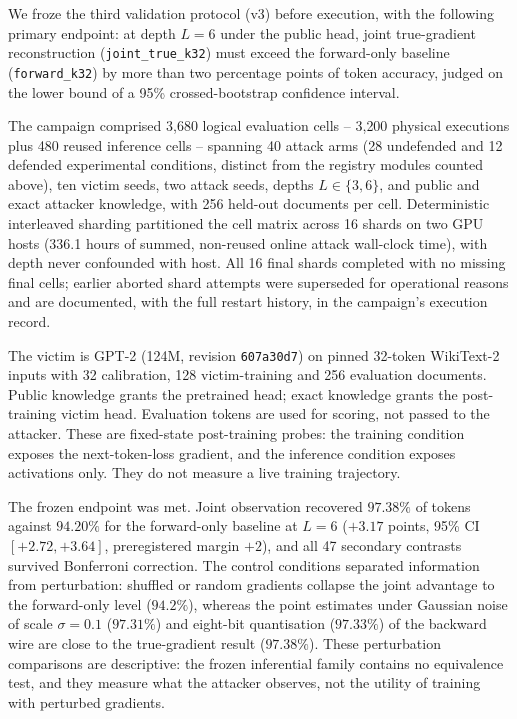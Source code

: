 \documentclass[11pt]{article}
\begin{document}
We froze the third validation protocol (v3) before execution, with the following primary endpoint: at depth $L{=}6$ under the public head, joint true-gradient reconstruction (\texttt{joint\_true\_k32}) must exceed the forward-only baseline (\texttt{forward\_k32}) by more than two percentage points of token accuracy, judged on the lower bound of a 95\% crossed-bootstrap confidence interval.

The campaign comprised 3{,}680 logical evaluation cells -- 3{,}200 physical executions plus 480 reused inference cells -- spanning 40 attack arms (28 undefended and 12 defended experimental conditions, distinct from the registry modules counted above), ten victim seeds, two attack seeds, depths $L \in \{3, 6\}$, and public and exact attacker knowledge, with 256 held-out documents per cell. Deterministic interleaved sharding partitioned the cell matrix across 16 shards on two GPU hosts (336.1 hours of summed, non-reused online attack wall-clock time), with depth never confounded with host. All 16 final shards completed with no missing final cells; earlier aborted shard attempts were superseded for operational reasons and are documented, with the full restart history, in the campaign's execution record.

The victim is GPT-2 (124M, revision \texttt{607a30d7}) on pinned 32-token WikiText-2 inputs with 32 calibration, 128 victim-training and 256 evaluation documents. Public knowledge grants the pretrained head; exact knowledge grants the post-training victim head. Evaluation tokens are used for scoring, not passed to the attacker. These are fixed-state post-training probes: the training condition exposes the next-token-loss gradient, and the inference condition exposes activations only. They do not measure a live training trajectory.

The frozen endpoint was met. Joint observation recovered $97.38\%$ of tokens against $94.20\%$ for the forward-only baseline at $L{=}6$ ($+3.17$ points, 95\% CI $[+2.72, +3.64]$, preregistered margin $+2$), and all 47 secondary contrasts survived Bonferroni correction. The control conditions separated information from perturbation: shuffled or random gradients collapse the joint advantage to the forward-only level ($94.2\%$), whereas the point estimates under Gaussian noise of scale $\sigma{=}0.1$ ($97.31\%$) and eight-bit quantisation ($97.33\%$) of the backward wire are close to the true-gradient result ($97.38\%$). These perturbation comparisons are descriptive: the frozen inferential family contains no equivalence test, and they measure what the attacker observes, not the utility of training with perturbed gradients.
\end{document}

